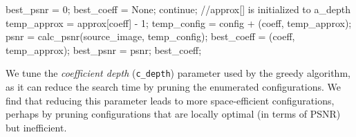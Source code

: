 \begin{algorithm}
\begin{footnotesize}
\begin{algorithmic}
\State best\_psnr = 0;
\State best\_coeff = None;
    \State continue;
    \EndIf
    \State //approx[] is initialized to a\_depth
    \State temp\_approx = approx[coeff] - 1;
    \State temp\_config = config + (coeff, temp\_approx);
    \State psnr = calc\_psnr(source\_image, temp\_config);
    \State best\_coeff = (coeff, temp\_approx);
    \State best\_psnr = psnr;
    \EndIf
\EndFor
\State \Return best\_coeff;
\end{algorithmic} 
\end{footnotesize}
\end{algorithm}
%
We tune the \emph{coefficient depth} (\texttt{c\_depth}) parameter used by the greedy algorithm, as it can reduce the search time by pruning the enumerated configurations.
We find that reducing this parameter leads to more space-efficient configurations, perhaps by pruning configurations that are locally optimal (in terms of PSNR) but inefficient.

